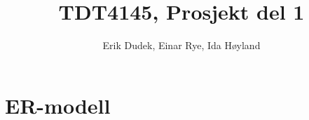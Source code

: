 \documentclass[a4paper,12pt]{article}
\begin{document}
\title{TDT4145, Prosjekt del 1}
\author{Erik Dudek, Einar Rye, Ida Høyland}
\maketitle

\tableofcontents


\newpage{}

\section{ER-modell}
\begin{figure}[H]
\centering
\noindent{}
\end{figure}
\newpage{}
\end{document}

